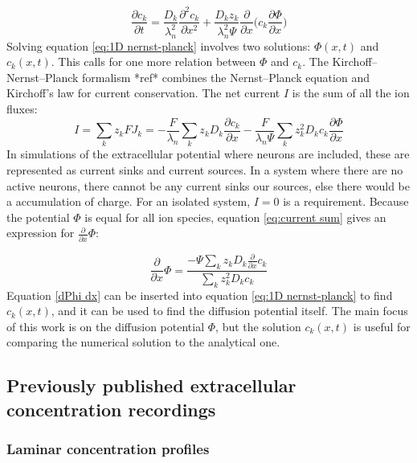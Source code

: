 \documentclass{article}
\begin{document}
\begin{equation}\label{eq:1D nernst-planck}
\frac{\partial c_k}{\partial t}= \frac{D_k}{\lambda_n^2} \frac{\partial^2 c_k}{\partial x^2}+\frac{D_k z_k}{\lambda_n^2 \Psi} \frac{\partial }{\partial x}  \bigg(c_k \frac{\partial \Phi}{\partial x} \bigg)
\end{equation}
Solving equation \ref{eq:1D nernst-planck} involves two solutions: $\Phi (x,t)$ and $c_k(x,t)$. This calls for one more relation between $\Phi$ and $c_k$. The Kirchoff--Nernst--Planck formalism *ref* combines the Nernst--Planck equation and Kirchoff's law for current conservation. 
The net current $I$ is the sum of all the ion fluxes:
\begin{equation}\label{eq:current sum}
I = \sum_{k}z_k FJ_k = -\frac{F}{\lambda_n}\sum_k z_k D_k  \frac{\partial c_k}{ \partial x} - \frac{F}{\lambda_n \Psi}\sum_k z_k^2D_k c_k \frac{\partial \Phi}{\partial x}
\end{equation}
In simulations of the extracellular potential where neurons are included, these are represented as current sinks and current sources. In a system where there are no active neurons, there cannot be any current sinks our sources, else there would be a accumulation of charge. For an isolated system, $I=0$ is a requirement. Because the potential 
$\Phi$ is equal for all ion species, equation \ref{eq:current sum} gives an  expression for $ \frac{\partial}{\partial x} \Phi$:

\begin{equation}\label{dPhi dx}
\frac{\partial}{\partial x} \Phi = \frac{-\Psi \sum_k z_k D_k \frac{\partial}{\partial x} c_k}{\sum_k z_k^2 D_k c_k}
\end{equation}
Equation \ref{dPhi dx} can be inserted into equation \ref{eq:1D nernst-planck} to find $c_k(x,t)$, and it can be used to find the diffusion potential itself. The main focus of this work is on the diffusion potential $\Phi$, but the solution $c_k(x,t)$ is useful for comparing the numerical solution to the analytical one.

\subsection{Previously published extracellular concentration recordings}\label{EC c recordings}
 
\subsubsection{Laminar concentration profiles}
\end{document}
